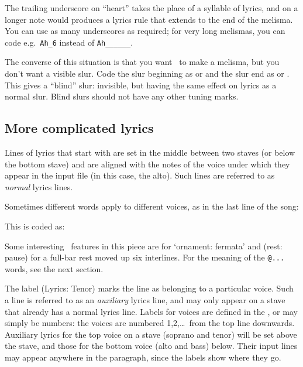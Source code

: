 \documentclass[11pt]{article}
\begin{document}
\bigskip
{}
\bigskip

The trailing underscore on ``heart'' takes the place of a
syllable of lyrics, and on a longer note would
produces a lyrics rule that extends to the end of the melisma.
You can use as many underscores as required; for very long melismas,
you can code e.g.\ \verb"Ah_6" instead of \verb"Ah______".
 
The converse of this situation is that you want \MTx\ to
make a melisma, but you don't want a visible slur.  
Code
the slur beginning as \ttxem{(\snake} or \ttxem{\LBR\snake} and 
the slur end as \ttxem{)\snake}
or \ttxem{\RBR\snake}.  This gives a ``blind'' slur: invisible, but having the
same effect on lyrics as a normal slur.   Blind slurs
should not have any other tuning marks.

\subsection{More complicated lyrics}  \label{More lyrics}

Lines of lyrics that start with  are set in the middle 
between two staves (or below the bottom stave) and are aligned with the 
notes of the voice under which they appear in the input file (in this 
case, the alto).   Such lines are referred to as \emph{normal} lyrics
lines.  

Sometimes different words apply to different voices, as in the last line 
of the song: 

\hskip -20mm
\begin{mus}
\small

\end{mus}
\vskip 12pt
This is coded as:

Some interesting \PMX\ features in this piece are  for 
`\mark ornament: \mark fermata' and 
 (\mark rest: 
\mark pause) for a full-bar rest moved up six interlines.  
For the meaning of the \verb'@...' words, see the next section. 

The label  (\mark Lyrics: \mark Tenor) marks the line as 
belonging to a particular voice.  Such a line is referred to as an 
\emph{auxiliary} 
lyrics line, and may only appear on a stave that
already has a normal lyrics line.  Labels for voices are defined in the 
, or may simply be numbers: the voices are numbered 
1,2,\ldots\ from the top line downwards. Auxiliary lyrics for the top voice 
on a stave (soprano and tenor) will be set above the stave, and those 
for the bottom voice (alto and bass) below. Their input lines may appear 
anywhere in the paragraph, since the labels show where they go. 
\end{document}
